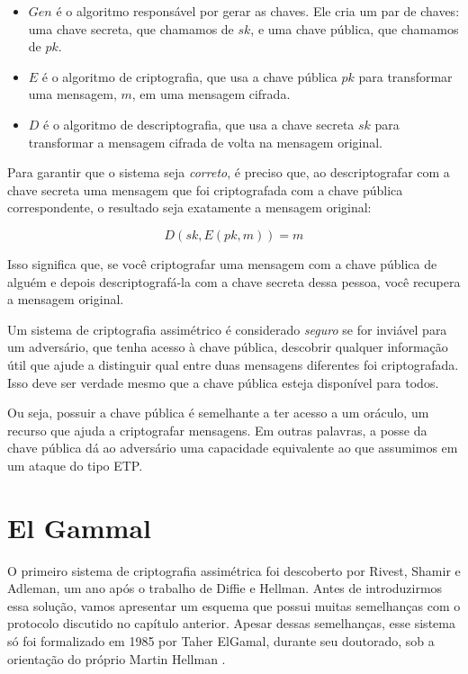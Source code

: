 \begin{itemize}
\item[] $Gen$ é o algoritmo responsável por gerar as chaves.
  Ele cria um par de chaves: uma chave secreta, que chamamos de $sk$, e uma chave pública, que chamamos de $pk$.
\item[] $E$ é o algoritmo de criptografia, que usa a chave pública $pk$ para transformar uma mensagem, $m$, em uma mensagem cifrada.
\item[] $D$ é o algoritmo de descriptografia, que usa a chave secreta $sk$ para transformar a mensagem cifrada de volta na mensagem original.
\end{itemize}

Para garantir que o sistema seja {\em correto}, é preciso que, ao descriptografar com a chave secreta uma mensagem que foi criptografada com a chave pública correspondente, o resultado seja exatamente a mensagem original:

\begin{displaymath}
  D(sk, E(pk, m)) = m
\end{displaymath}

Isso significa que, se você criptografar uma mensagem com a chave pública de alguém e depois descriptografá-la com a chave secreta dessa pessoa, você recupera a mensagem original.

Um sistema de criptografia assimétrico é considerado \textit{seguro} se for inviável para um adversário, que tenha acesso à chave pública, descobrir qualquer informação útil que ajude a distinguir qual entre duas mensagens diferentes foi criptografada.
Isso deve ser verdade mesmo que a chave pública esteja disponível para todos.

Ou seja, possuir a chave pública é semelhante a ter acesso a um oráculo, um recurso que ajuda a criptografar mensagens.
Em outras palavras, a posse da chave pública dá ao adversário uma capacidade equivalente ao que assumimos em um ataque do tipo ETP.



\section{El Gammal}
\label{sec:el-gammal}

O primeiro sistema de criptografia assimétrica foi descoberto por Rivest, Shamir e Adleman, um ano após o trabalho de Diffie e Hellman.
Antes de introduzirmos essa solução, vamos apresentar um esquema que possui muitas semelhanças com o protocolo discutido no capítulo anterior.
Apesar dessas semelhanças, esse sistema só foi formalizado em 1985 por Taher ElGamal, durante seu doutorado, sob a orientação do próprio Martin Hellman \cite{ElGamal85}.


